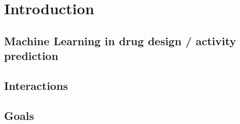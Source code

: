 \chapter{Introduction}\label{cha:Introduction}



\section{Machine Learning in drug design / activity prediction}

\section{Interactions}


\section{Goals}



